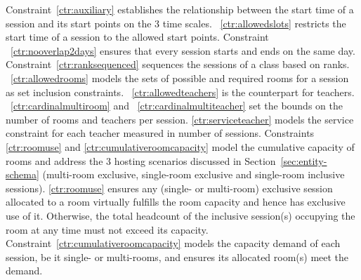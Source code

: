 \documentclass[runningheads]{llncs}
\begin{document}
Constraint~\ref{ctr:auxiliary} establishes the relationship between the start time of a session and its start points on the 3 time scales.
~\ref{ctr:allowedslots} restricts the start time of a session to the allowed start points.
Constraint ~\ref{ctr:nooverlap2days} ensures that every session starts and ends on the same day.
Constraint~\ref{ctr:ranksequenced} sequences the sessions of a class based on ranks. 
~\ref{ctr:allowedrooms} models the sets of possible and required rooms for a session as set inclusion constraints.
~\ref{ctr:allowedteachers} is the counterpart for teachers.
~\ref{ctr:cardinalmultiroom} and ~\ref{ctr:cardinalmultiteacher} set the bounds on the number of rooms and teachers per session.  
\ref{ctr:serviceteacher} models the service constraint for each teacher measured in number of sessions.
Constraints \ref{ctr:roomuse} and \ref{ctr:cumulativeroomcapacity}
model the cumulative capacity of rooms
and address the 3 hosting scenarios discussed in Section~\ref{sec:entity-schema}
(multi-room exclusive, single-room exclusive and single-room inclusive sessions).
\ref{ctr:roomuse} ensures any (single- or multi-room) exclusive session allocated to a room
virtually fulfills the room capacity and hence has exclusive use of it.
Otherwise, the total headcount of the inclusive session(s) occupying the room at any time must not exceed its capacity. 
Constraint~\ref{ctr:cumulativeroomcapacity} models the capacity demand of each session, be it single- or multi-rooms, and ensures its allocated room(s) meet the demand.
\end{document}
